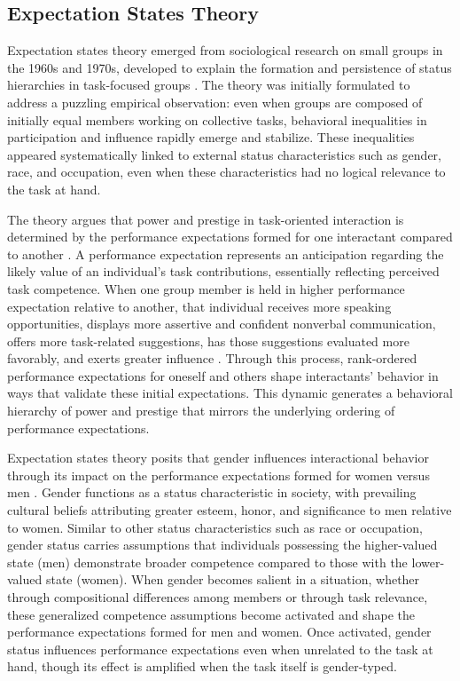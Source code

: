 \subsection{Expectation States Theory}

Expectation states theory emerged from sociological research on small groups in the 1960s and 1970s, developed to explain the formation and persistence of status hierarchies in task-focused groups \citep{Berger-1974-ExpectationStatesTheory}. The theory was initially formulated to address a puzzling empirical observation: even when groups are composed of initially equal members working on collective tasks, behavioral inequalities in participation and influence rapidly emerge and stabilize. These inequalities appeared systematically linked to external status characteristics such as gender, race, and occupation, even when these characteristics had no logical relevance to the task at hand.

The theory argues that power and prestige in task-oriented interaction is determined by the performance expectations formed for one interactant compared to another \citep{Berger-1974-ExpectationStatesTheory}. A performance expectation represents an anticipation regarding the likely value of an individual's task contributions, essentially reflecting perceived task competence. When one group member is held in higher performance expectation relative to another, that individual receives more speaking opportunities, displays more assertive and confident nonverbal communication, offers more task-related suggestions, has those suggestions evaluated more favorably, and exerts greater influence \citep{Berger-1974-ExpectationStatesTheory, Ridgeway-1985-NonverbalCuesAndStatus, Ridgeway-1987-Nonverbal}. Through this process, rank-ordered performance expectations for oneself and others shape interactants' behavior in ways that validate these initial expectations. This dynamic generates a behavioral hierarchy of power and prestige that mirrors the underlying ordering of performance expectations.

Expectation states theory posits that gender influences interactional behavior through its impact on the performance expectations formed for women versus men \citep{Berger-1977-Status, Berger-1980-Status}. Gender functions as a status characteristic in society, with prevailing cultural beliefs attributing greater esteem, honor, and significance to men relative to women. Similar to other status characteristics such as race or occupation, gender status carries assumptions that individuals possessing the higher-valued state (men) demonstrate broader competence compared to those with the lower-valued state (women). When gender becomes salient in a situation, whether through compositional differences among members or through task relevance, these generalized competence assumptions become activated and shape the performance expectations formed for men and women. Once activated, gender status influences performance expectations even when unrelated to the task at hand, though its effect is amplified when the task itself is gender-typed.

